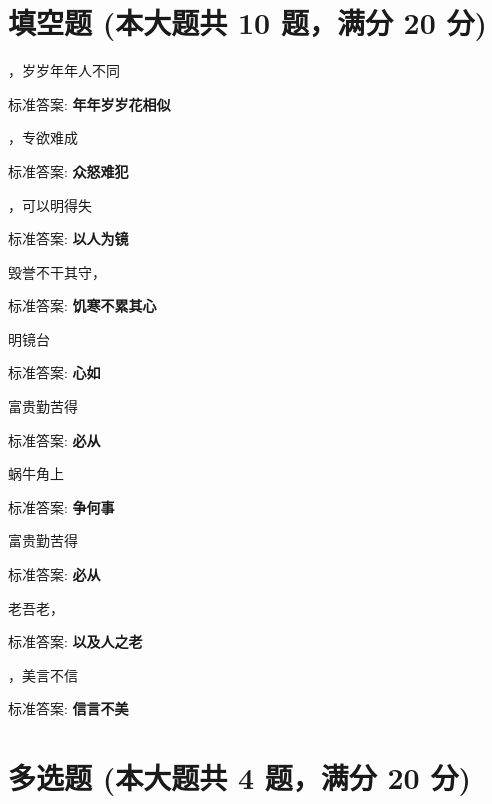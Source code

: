 \documentclass[12pt, a4paper, addpoints, answers]{exam}
\begin{document}
\hspace{5cm}

\section{\normalsize{填空题 (本大题共 10 题，满分 20 分)}}
\hspace{1.5cm}
\begin{multicols}{2}
\begin{questions}
\question[2] \fillin ，岁岁年年人不同

标准答案: \textbf{年年岁岁花相似}

\question[2] \fillin ，专欲难成

标准答案: \textbf{众怒难犯}

\question[2] \fillin ，可以明得失

标准答案: \textbf{以人为镜}

\question[2] 毁誉不干其守，\fillin 

标准答案: \textbf{饥寒不累其心}

\question[2] \fillin 明镜台

标准答案: \textbf{心如}

\question[2] 富贵\fillin 勤苦得

标准答案: \textbf{必从}

\question[2] 蜗牛角上\fillin 

标准答案: \textbf{争何事}

\question[2] 富贵\fillin 勤苦得

标准答案: \textbf{必从}

\question[2] 老吾老，\fillin 

标准答案: \textbf{以及人之老}

\question[2] \fillin ，美言不信

标准答案: \textbf{信言不美}
\end{questions}
\end{multicols}

\hspace{5cm}

\section{\normalsize{多选题 (本大题共 4 题，满分 20 分)}}
\hspace{1.5cm}
\end{document}
